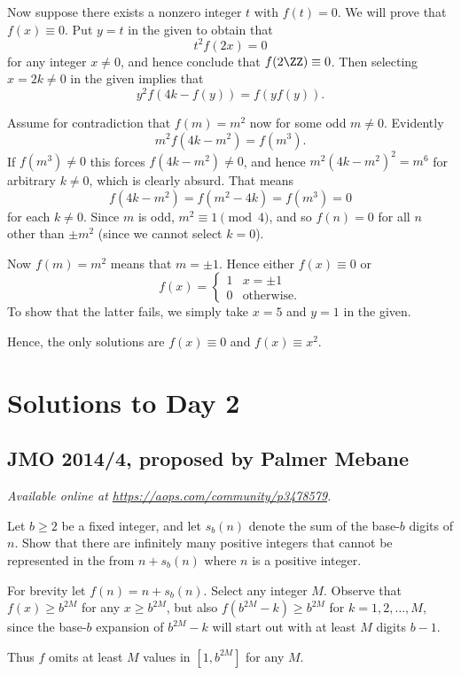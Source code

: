 \documentclass[11pt]{scrartcl}
\begin{document}
Now suppose there exists a nonzero integer $t$ with $f(t) = 0$.
We will prove that $f(x) \equiv 0$.
Put $y=t$ in the given to obtain that
\[ t^2 f(2x) = 0 \]
for any integer $x \neq 0$, and hence conclude that $f(2 \ZZ) \equiv 0$.
Then selecting $x = 2k \neq 0$ in the given implies that
\[ y^2 f(4k-f(y)) = f(yf(y)). \]

Assume for contradiction that $f(m) = m^2$ now for some odd $m \neq 0$.
Evidently \[ m^2 f(4k-m^2) = f(m^3). \]
If $f(m^3) \neq 0$ this forces $f(4k-m^2) \neq 0$,
and hence $m^2(4k-m^2)^2 = m^6$ for arbitrary $k \neq 0$, which is clearly absurd.
That means \[ f(4k-m^2) = f(m^2-4k) = f(m^3) = 0 \] for each $k \neq 0$.
Since $m$ is odd, $m^2 \equiv 1 \pmod 4$,
and so $f(n) = 0$ for all $n$ other than $\pm m^2$
(since we cannot select $k=0$).

Now $f(m) = m^2$ means that $m = \pm 1$.
Hence either $f(x) \equiv 0$ or
\[ f(x) = \begin{cases} 1 & x = \pm 1 \\ 0 & \text{otherwise}. \end{cases} \]
To show that the latter fails,
we simply take $x=5$ and $y=1$ in the given.

Hence, the only solutions are $f(x) \equiv 0$ and $f(x) \equiv x^2$.
\pagebreak

\section{Solutions to Day 2}
\subsection{JMO 2014/4, proposed by Palmer Mebane}
\textsl{Available online at \url{https://aops.com/community/p3478579}.}
\begin{mdframed}[style=mdpurplebox,frametitle={Problem statement}]
Let $b \ge 2$ be a fixed integer,
and let $s_b(n)$ denote the sum of the base-$b$ digits of $n$.
Show that there are infinitely many positive
integers that cannot be represented in the from $n + s_b(n)$
where $n$ is a positive integer.
\end{mdframed}
For brevity let $f(n) = n + s_b(n)$.
Select any integer $M$.
Observe that $f(x) \ge b^{2M}$ for any $x \ge b^{2M}$,
but also $f(b^{2M}-k) \ge b^{2M}$ for $k = 1, 2, \dots, M$,
since the base-$b$ expansion of $b^{2M}-k$ will start out with
at least $M$ digits $b-1$.

Thus $f$ omits at least $M$ values in $[1, b^{2M}]$ for any $M$.
\pagebreak
\end{document}
